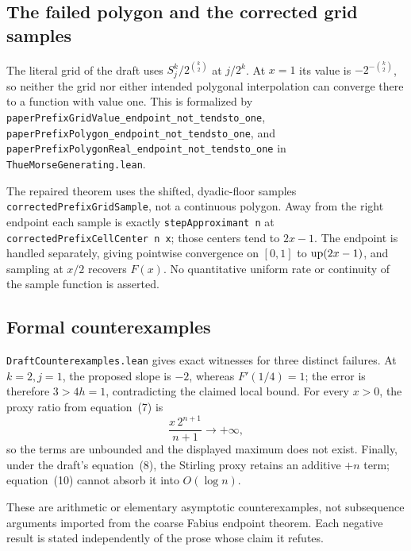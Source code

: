 \documentclass[11pt,oneside]{article}
\theoremstyle{definition}
\theoremstyle{remark}
\begin{document}
\subsection{The failed polygon and the corrected grid samples}
The literal grid of the draft uses
\(S^k_j/2^{\binom{k}{2}}\) at \(j/2^k\).  At \(x=1\) its value is
\(-2^{-\binom{k}{2}}\), so neither the grid nor either intended polygonal
interpolation can converge there to a function with value one.  This is
formalized by \nolinkurl{paperPrefixGridValue_endpoint_not_tendsto_one},
\nolinkurl{paperPrefixPolygon_endpoint_not_tendsto_one}, and
\nolinkurl{paperPrefixPolygonReal_endpoint_not_tendsto_one} in
\nolinkurl{ThueMorseGenerating.lean}.

The repaired theorem uses the shifted, dyadic-floor samples
\nolinkurl{correctedPrefixGridSample}, not a continuous polygon.  Away from the
right endpoint each sample is exactly \nolinkurl{stepApproximant n} at
\nolinkurl{correctedPrefixCellCenter n x}; those centers tend to \(2x-1\).  The
endpoint is handled separately, giving pointwise convergence on \([0,1]\) to
\(\operatorname{up}(2x-1)\), and sampling at \(x/2\) recovers \(F(x)\).  No quantitative
uniform rate or continuity of the sample function is asserted.

\subsection{Formal counterexamples}
\nolinkurl{DraftCounterexamples.lean} gives exact witnesses for three distinct
failures.  At \(k=2,j=1\), the proposed slope is \(-2\), whereas
\(F'(1/4)=1\); the error is therefore \(3>4h=1\), contradicting the claimed
local bound.  For every \(x>0\), the proxy ratio from equation~(7) is
\[
  \frac{x\,2^{n+1}}{n+1}\longrightarrow+\infty,
\]
so the terms are unbounded and the displayed maximum does not exist.
Finally, under the draft's equation~(8), the Stirling proxy retains an
additive \(+n\) term; equation~(10) cannot absorb it into \(O(\log n)\).

These are arithmetic or elementary asymptotic counterexamples, not
subsequence arguments imported from the coarse Fabius endpoint theorem.  Each
negative result is stated independently of the prose whose claim it refutes.
\end{document}
